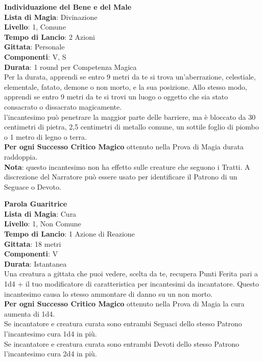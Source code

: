\documentclass[a4paper,twoside,openany]{book}
\begin{document}
\begin{multicols}{2}
\medskip\textbf{Individuazione del Bene e del Male}\\
\textbf{Lista di Magia}: Divinazione\\
\textbf{Livello}: 1, Comune\\
\textbf{Tempo di Lancio}: 2 Azioni\\
\textbf{Gittata}: Personale\\
\textbf{Componenti}: V, S\\
\textbf{Durata}: 1 round per Competenza Magica\\
Per la durata, apprendi se entro 9 metri da te si trova un'aberrazione, celestiale, elementale, fatato, demone o non morto, e la sua posizione. Allo stesso modo, apprendi se entro 9 metri da te si trovi un luogo o oggetto che sia stato consacrato o dissacrato magicamente.\\
l'incantesimo può penetrare la maggior parte delle barriere, ma è bloccato da 30 centimetri di pietra, 2,5 centimetri di metallo comune, un sottile foglio di piombo o 1 metro di legno o terra.\\
\textbf{Per ogni Successo Critico Magico} ottenuto nella Prova di Magia durata raddoppia.\\
\textbf{Nota}: questo incantesimo non ha effetto sulle creature che seguono i Tratti. A discrezione del Narratore può essere usato per identificare il Patrono di un Seguace o Devoto.

\medskip\textbf{Parola Guaritrice}\\
\textbf{Lista di Magia}: Cura\\
\textbf{Livello}: 1, Non Comune\\
\textbf{Tempo di Lancio}: 1 Azione di Reazione\\
\textbf{Gittata}: 18 metri\\
\textbf{Componenti}: V\\
\textbf{Durata}: Istantanea\\
Una creatura a gittata che puoi vedere, scelta da te, recupera Punti Ferita pari a 1d4 + il tuo modificatore di caratteristica per incantesimi da incantatore. Questo incantesimo causa lo stesso ammontare di danno su un non morto.\\
\textbf{Per ogni Successo Critico Magico} ottenuto nella Prova di Magia la cura aumenta di 1d4.\\
Se incantatore e creatura curata sono entrambi Seguaci dello stesso Patrono l'incantesimo cura 1d4 in più.\\
Se incantatore e creatura curata sono entrambi Devoti dello stesso Patrono l'incantesimo cura 2d4 in più.


\end{multicols}
\end{document}
